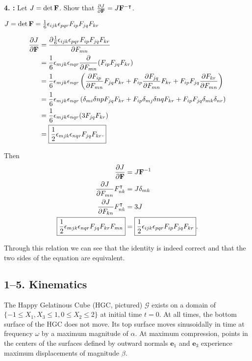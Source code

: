 \textbf{4. :}
Let $J = \det \mathbf{F}$. Show that $\frac{\partial J}{\partial \mathbf{F}} = J \mathbf{F}^{-\intercal}$.

$J = \det \mathbf{F} = \frac{1}{6} \epsilon_{ijk} \epsilon_{pqr} F_{ip} F_{jq} F_{kr}$

\begin{align*}
    \frac{\partial J}{\partial \mathbf{F}} &= \frac{\partial \frac{1}{6} \epsilon_{ijk} \epsilon_{pqr} F_{ip} F_{jq} F_{kr}}{\partial F_{mn}}\\
    &= \frac{1}{6} \epsilon_{mjk} \epsilon_{nqr} \frac{\partial}{\partial F_{mn}} (F_{ip} F_{jq} F_{kr})\\
    &= \frac{1}{6} \epsilon_{mjk} \epsilon_{nqr} \left( \frac{\partial F_{ip}}{\partial F_{mn}} F_{jq} F_{kr} + F_{ip}\frac{\partial F_{jq}}{\partial F_{mn}} F_{kr} + F_{ip} F_{jq} \frac{\partial F_{kr}}{\partial F_{mn}} \right)\\
    &= \frac{1}{6} \epsilon_{mjk} \epsilon_{nqr} \left( \delta_{mi} \delta{np} F_{jq} F_{kr} + F_{ip} \delta_{mj} \delta{nq} F_{kr} + F_{ip} F_{jq} \delta_{mk} \delta_{nr} \right)\\
    &= \frac{1}{6} \epsilon_{mjk} \epsilon_{nqr} (3 F_{jq} F_{kr})\\
    &= \boxed{\frac{1}{2} \epsilon_{mjk} \epsilon_{nqr} F_{jq} F_{kr}.}
\end{align*}

Then
\begin{align*}
    \frac{\partial J}{\partial \mathbf{F}} &= J \mathbf{F}^{-1}\\
    \frac{\partial J}{\partial F_{mn}} F_{nk}^\intercal &= J \delta_{mk}\\
    \frac{\partial J}{\partial F_{kn}} F_{nk}^\intercal &= 3J\\
    \boxed{\frac{1}{2} \epsilon_{mjk} \epsilon_{nqr} F_{jq} F_{kr} F_{mn}} &= \boxed{\frac{1}{2} \epsilon_{ijk} \epsilon_{pqr} F_{ip} F_{jq} F_{kr}}.
\end{align*}

Through this relation we can see that the identity is indeed correct and that the two sides of the equation are equivalent.

\newpage
\subsection*{1--5. \textbf{Kinematics}}
The Happy Gelatinous Cube (HGC, pictured) $\mathcal{G}$ exists on a domain of $\{-1\leq X_1 , X_3\leq1, 0\leq X_2 \leq 2\}$ at initial time $t=0$. 
At all times, the bottom surface of the HGC does not move. 
Its top surface moves sinusoidally in time at frequency $\omega$ by a maximum magnitude of $\alpha$. 
At maximum compression, points in the centers of the surfaces defined by outward normals $\bm{e}_1$ and $\bm{e}_3$ experience maximum displacements of magnitude $\beta$. 

